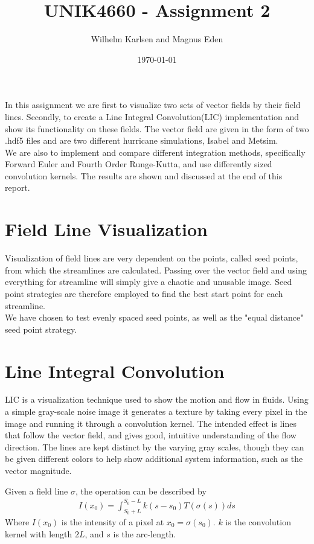 \documentclass[11pt,a4paper,english]{article}
\title{UNIK4660 - Assignment 2}
\author{Wilhelm Karlsen and Magnus Eden}
\date{\today}
\numberwithin{equation}{section}
\begin{document}
\maketitle
In this assignment we are first to visualize two sets of vector fields by their field lines. Secondly, to create a Line Integral Convolution(LIC) implementation and show its functionality on these fields. The vector field are given in the form of two .hdf5 files and are two different hurricane simulations, Isabel and Metsim. 
\\
We are also to implement and compare different integration methods, specifically Forward Euler and Fourth Order Runge-Kutta, and use differently sized convolution kernels. The results are shown and discussed at the end of this report.

\section{Field Line Visualization}
Visualization of field lines are very dependent on the points, called seed points, from which the streamlines are calculated. Passing over the vector field and using everything for streamline will simply give a chaotic and unusable image. Seed point strategies are therefore employed to find the best start point for each streamline. 
\\
We have chosen to test evenly spaced seed points, as well as the "equal distance" seed point strategy.

\section{Line Integral Convolution}
LIC is a visualization technique used to show the motion and flow in fluids. Using a simple gray-scale noise image it generates a texture by taking every pixel in the image and running it through a convolution kernel. The intended effect is lines that follow the vector field, and gives good, intuitive understanding of the flow direction. The lines are kept distinct by the varying gray scales, though they can be given different colors to help show additional system information, such as the vector magnitude.

Given a field line $\sigma$, the operation can be described by
\begin{align*}
	I(x_0) = \int_{S_0+L}^{S_0-L}k(s - s_0)T(\sigma(s))ds
\end{align*}
Where $I(x_0)$ is the intensity of a pixel at $x_0 = \sigma(s_0)$. $k$ is the convolution kernel with length $2L$, and $s$ is the arc-length.
\end{document}
